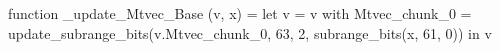 function _update_Mtvec_Base (v, x) = let v = { v with Mtvec_chunk_0 = update_subrange_bits(v.Mtvec_chunk_0, 63, 2, subrange_bits(x, 61, 0)) } in
  v

